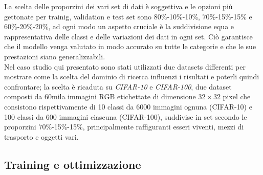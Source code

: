 \iffalse
La pratica più comune è quella di suddividere l'insieme rispettivamente in: 
\begin{itemize}
    \item dati di allenamento, o \textit{training set}, che di solito costituiscono l'80\% del dataset originario e sono utilizzati per far imparare al modello i pesi che migliorano l'accuratezza di predizione, minimizzando la discrepanza tra le previsioni del modello e le etichette corrette associate alle immagini di addestramento;
    \item dati di validazione, o \textit{validation set}, che ne costituiscono il 10\% e si utilizzano per monitorare la capacità predittiva del modello su dati mai visti in fase di allenamento e per evitare l'\textit{overfitting};
    \item dati di test, o \textit{test set}, che ne costituiscono il rimanente 10\% e vengono utilizzati una sola volta per valutare le prestazioni finali del modello ed ottenere una stima accurata delle capacità di generalizzazione della rete su dati mai visti prima, simulando il contesto di applicazione reale.
\end{itemize}
\fi

La scelta delle proporzini dei vari set di dati è soggettiva e le opzioni più gettonate per trainig, validation e test set sono 80\%-10\%-10\%, 70\%-15\%-15\% e 60\%-20\%-20\%, ad ogni modo un aspetto cruciale è la suddivisione equa e rappresentativa delle classi e delle variazioni dei dati in ogni set. Ciò garantisce che il modello venga valutato in modo accurato su tutte le categorie e che le sue prestazioni siano generalizzabili. \\

Nel caso studio qui presentato sono stati utilizzati due datasets differenti per mostrare come la scelta del dominio di ricerca influenzi i risultati e poterli quindi confrontare; la scelta è ricaduta su \textit{CIFAR-10} e \textit{CIFAR-100}, due dataset composti da 60mila immagini RGB etichettate di dimensione $32\times32$ pixel che consistono rispettivamente di 10 classi da 6000 immagini ognuna (CIFAR-10) e 100 classi da 600 immagini ciascuna (CIFAR-100), suddivise in set secondo le proporzini 70\%-15\%-15\%, principalmente raffiguranti esseri viventi, mezzi di trasporto e oggetti vari.
\cite{datasets}

\subsection{Training e ottimizzazione}

